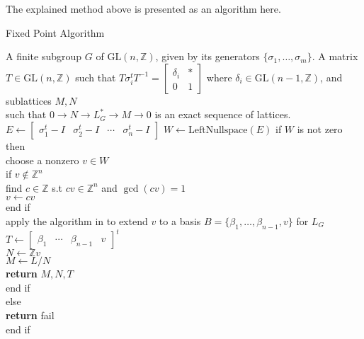 \documentclass[12pt]{article}
\theoremstyle{plain}
\theoremstyle{definition}
\newcommand{\Z}{\ensuremath{\mathbb{Z}}}
\begin{document}
The explained method above is presented as an algorithm here.
\begin{algorithm}[H]
	\caption{Fixed Point Algorithm}
	\label{alg:Fixed Point}
	\begin{algorithmic}[1]
		\REQUIRE A finite subgroup $G$ of $\mathrm{GL}(n,\Z)$, given by its generators $\lbrace \sigma_1, \ldots , \sigma_m \rbrace$.
		\ENSURE A matrix $T \in \mathrm{GL}(n,\Z)$ such that $T \sigma^t_i T^{-1}= \left[ \begin{array}{c|c}
		\delta_i & \ast \\
		\hline 
		0 &1
		\end{array} \right]
		$ where $\delta_i \in \mathrm{GL}(n-1,\Z)$, and sublattices $M, N$ \\
		\hspace{0.8cm}such that $0\longrightarrow N \longrightarrow L^*_G \longrightarrow M \longrightarrow 0$ 
		is an exact sequence of lattices.
		\bigskip
		\STATE $E \gets \left[ \begin{array}{c|c|c|c}
		\sigma^t_1-I & \sigma^t_2 -I & \cdots & \sigma^t_n -I
		\end{array} \right]$
	    \STATE $W \gets \mathrm{LeftNullspace}(E)$
	    \STATE if $W $ is not zero then\\
	    \hspace{0.5in} choose a nonzero $v \in W$\\
	    \hspace{0.5 in} if $v \notin \Z^n$ \\
	    \hspace{1in} find $c \in \Z$ s.t $cv \in \Z^n$ and $\gcd(cv) = 1$\\
	    \hspace{1in} $v \gets cv$\\
	    \hspace{0.5 in} end if\\
	    \hspace{0.5in} apply the algorithm in \cite{LatticeBase} to extend $v$ to a basis $B = \lbrace \beta_1, \ldots, \beta_{n-1},v\rbrace$ for $L_G$\\
	    \hspace{0.5in} $T \gets \begin{bmatrix}
	    \beta_1 &  \cdots &  \beta_{n-1}& v
	    \end{bmatrix}^t$\\
		\hspace{0.5in} $N \gets \Z v$\\
		\hspace{0.5in} $M \gets L/N$\\
		\hspace{0.5in} \textbf{return} $M,N, T$\\
	  \hspace{0.5in} end if\\
	  else\\
	     \hspace{0.5in}  \textbf{return} fail\\
	     end if
	 	\end{algorithmic}
\end{algorithm}
\end{document}
